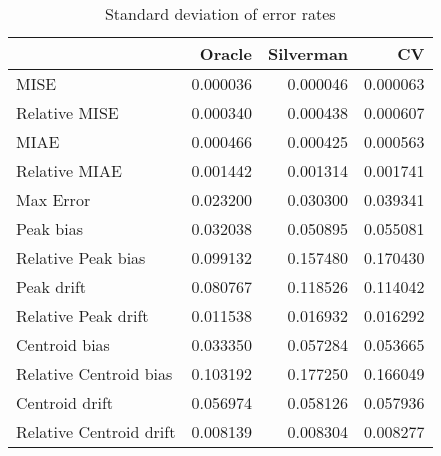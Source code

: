 \begin{table}[H]
\centering
\begin{tabular}{lrrr}
  \hline
 & Oracle & Silverman & CV \\ 
  \hline
MISE & 0.000036 & 0.000046 & 0.000063 \\ 
  Relative MISE & 0.000340 & 0.000438 & 0.000607 \\ 
  MIAE & 0.000466 & 0.000425 & 0.000563 \\ 
  Relative MIAE & 0.001442 & 0.001314 & 0.001741 \\ 
  Max Error & 0.023200 & 0.030300 & 0.039341 \\ 
  Peak bias & 0.032038 & 0.050895 & 0.055081 \\ 
  Relative Peak bias & 0.099132 & 0.157480 & 0.170430 \\ 
  Peak drift & 0.080767 & 0.118526 & 0.114042 \\ 
  Relative Peak drift & 0.011538 & 0.016932 & 0.016292 \\ 
  Centroid bias & 0.033350 & 0.057284 & 0.053665 \\ 
  Relative Centroid bias & 0.103192 & 0.177250 & 0.166049 \\ 
  Centroid drift & 0.056974 & 0.058126 & 0.057936 \\ 
  Relative Centroid drift & 0.008139 & 0.008304 & 0.008277 \\ 
   \hline
\end{tabular}
\caption{Standard deviation of error rates} 
\label{tbl:stddev_error_rates}
\end{table}
